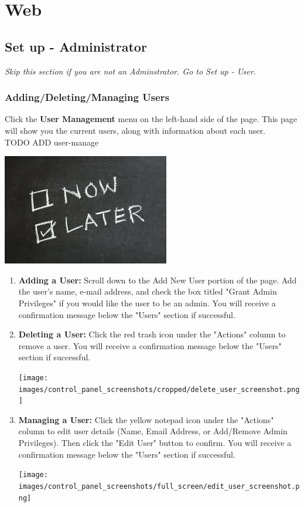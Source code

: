   \section{Web}
  \subsection{Set up - Administrator}
  \emph{Skip this section if you are not an Adminstrator. Go to Set up - User.}\\
  \subsubsection{Adding/Deleting/Managing Users}
    Click the \textbf{User Management} menu on the left-hand side of the page.  This page will
      show you the current users, along with information about each user.\\
TODO ADD user-manage
      \begin{center}
      \includegraphics[scale=1]{images/Now-Later.png}
    \end{center}
    \begin{enumerate}
      \item \textbf{Adding a User:} Scroll down to the Add New User portion of the page.  Add the user's name,
      e-mail address, and check the box titled "Grant Admin Privileges" if you would like the user to be an
      admin.  You will receive a confirmation message below the "Users" section if successful.

      \item \textbf{Deleting a User:} Click the red trash icon under the "Actions" column to remove a user.
      You will receive a confirmation message below the "Users" section if successful.
      \begin{center}
        \texttt{[image: images/control\_panel\_screenshots/cropped/delete\_user\_screenshot.png]}
      \end{center}
      \item \textbf{Managing a User:} Click the yellow notepad icon under the "Actions" column to edit user
      details (Name, Email Address, or Add/Remove Admin Privileges).  Then click the "Edit User" button to confirm.
      You will receive a confirmation message below the "Users" section if successful.
      \begin{center}
        \texttt{[image: images/control\_panel\_screenshots/full\_screen/edit\_user\_screenshot.png]}
    \end{center}
    \end{enumerate}

